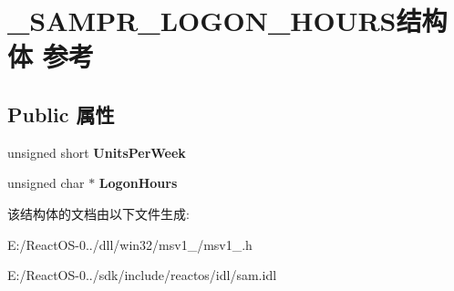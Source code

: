 \hypertarget{struct___s_a_m_p_r___l_o_g_o_n___h_o_u_r_s}{}\section{\+\_\+\+S\+A\+M\+P\+R\+\_\+\+L\+O\+G\+O\+N\+\_\+\+H\+O\+U\+R\+S结构体 参考}
\label{struct___s_a_m_p_r___l_o_g_o_n___h_o_u_r_s}
\subsection*{Public 属性}
\begin{DoxyCompactItemize}
\item 
\mbox{\label{struct___s_a_m_p_r___l_o_g_o_n___h_o_u_r_s_a7b7396f2cda776eaa6ee733f3da1e072}} 
unsigned short {\bfseries Units\+Per\+Week}
\item 
\mbox{\label{struct___s_a_m_p_r___l_o_g_o_n___h_o_u_r_s_a0fb907c1d89519cb02876337c41ea0d7}} 
unsigned char $\ast$ {\bfseries Logon\+Hours}
\end{DoxyCompactItemize}


该结构体的文档由以下文件生成\+:\begin{DoxyCompactItemize}
\item 
E\+:/\+React\+O\+S-\/0../dll/win32/msv1\+\_/msv1\+\_.\+h\item 
E\+:/\+React\+O\+S-\/0../sdk/include/reactos/idl/sam.\+idl\end{DoxyCompactItemize}
